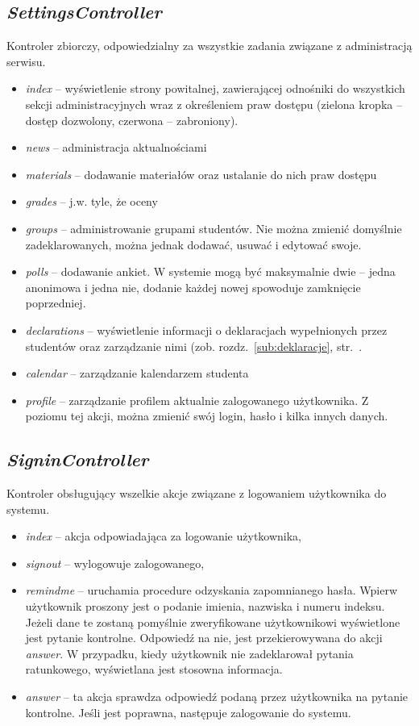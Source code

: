 \documentclass[a4paper,12pt,oneside]{report}
\begin{document}
\subsection{\emph{SettingsController}}
\label{con:settings}
  Kontroler zbiorczy, odpowiedzialny za wszystkie zadania związane z administracją serwisu.
\begin{itemize}
  \item \emph{index} -- wyświetlenie strony powitalnej, zawierającej odnośniki do wszystkich sekcji administracyjnych wraz z określeniem praw dostępu (zielona kropka -- dostęp dozwolony, czerwona -- zabroniony).
  \item \emph{news} -- administracja aktualnościami
  \item \emph{materials} -- dodawanie materiałów oraz ustalanie do nich praw dostępu
  \item \emph{grades} -- j.w. tyle, że oceny
  \item \emph{groups} -- administrowanie grupami studentów. Nie można zmienić domyślnie zadeklarowanych, można jednak dodawać, usuwać i edytować swoje.
  \item \emph{polls} -- dodawanie ankiet. W systemie mogą być maksymalnie dwie -- jedna anonimowa i jedna nie, dodanie każdej nowej spowoduje zamknięcie poprzedniej.
  \item \emph{declarations} -- wyświetlenie informacji o deklaracjach wypełnionych przez studentów oraz zarządzanie nimi (zob. rozdz.~\ref{sub:deklaracje}, str.~\pageref{sub:deklaracje}.
  \item \emph{calendar} -- zarządzanie kalendarzem studenta
  \item \emph{profile} -- zarządzanie profilem aktualnie zalogowanego użytkownika. Z poziomu tej akcji, można zmienić swój login, hasło i kilka innych danych.
\end{itemize}

\subsection{\emph{SigninController}}
\label{con:signin}
  Kontroler obsługujący wszelkie akcje związane z logowaniem użytkownika do systemu.
\begin{itemize}
  \item \emph{index} -- akcja odpowiadająca za logowanie użytkownika,
  \item \emph{signout} -- wylogowuje zalogowanego,
  \item \emph{remindme} -- uruchamia procedure odzyskania zapomnianego hasła. Wpierw użytkownik proszony jest o podanie imienia, nazwiska i numeru indeksu. Jeżeli dane te zostaną pomyślnie zweryfikowane użytkownikowi wyświetlone jest pytanie kontrolne. Odpowiedź na nie, jest przekierowywana do akcji \emph{answer}. W przypadku, kiedy użytkownik nie zadeklarował pytania ratunkowego, wyświetlana jest stosowna informacja.
  \item \emph{answer} -- ta akcja sprawdza odpowiedź podaną przez użytkownika na pytanie kontrolne. Jeśli jest poprawna, następuje zalogowanie do systemu.
\end{itemize}
\end{document}
